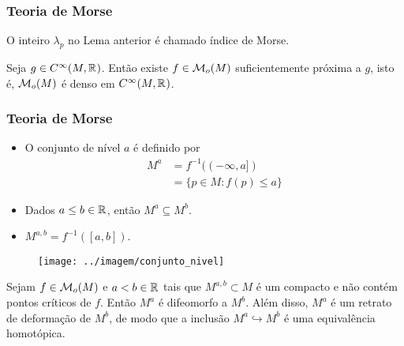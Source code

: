 \documentclass{beamer}
\begin{document}
\begin{footnotesize}
\begin{frame}
		\frametitle{Teoria de Morse}
		\begin{definicao}
			O inteiro $\lambda_{p}$ no Lema anterior é chamado índice de Morse.
		\end{definicao}
		
		\begin{teorema}
			Seja $g\in C^{\infty}(M, \mathbb{R}^{})$. Então existe $f \in \mathcal{M}_{o}(M)$ suficientemente próxima a $g$, isto é, $\mathcal{M}_{o}(M)$ é denso em $C^{\infty}(M, \mathbb{R}^{})$.
		\end{teorema}
	\end{frame}
	
	\begin{frame}
	
	\frametitle{Teoria de Morse}
		
			
			\begin{minipage}[t]{0.5\linewidth}
				\begin{itemize}
					\item O conjunto de nível $a$ é definido por
					$$
					\begin{aligned}
					M^{a}&= f^{-1}((-\infty, a]) 
					\\
					&= \{p \in M: f(p)\leq a\}
					\end{aligned}
					$$
					
					\item Dados $a\leq b \in \mathbb{R}^{}$, então $M^{a} \subseteq M^{b}$.
					
					\item $M^{a,b} = f^{-1}([a,b])$.
				\end{itemize}
			\end{minipage}
			\hfill%
			\begin{minipage}[t]{0.48\linewidth}
				\begin{figure}
					\centering
					\textbf{}\par
					\texttt{[image: ../imagem/conjunto\_nivel]}
				\end{figure}
				
			\end{minipage}
			
			\begin{teorema}
				Sejam $f \in \mathcal{M}_{o}(M)$ e $a<b \in \mathbb{R}^{}$ tais que $M^{a,b}\subset M$ é um compacto e não contém pontos críticos de $f$. Então $M^{a}$ é difeomorfo a $M^{b}$. Além disso, $M^{a}$ é um retrato de deformação de $M^{b}$, de modo que a inclusão  $M^{a} \hookrightarrow M^{b}$ é uma equivalência homotópica.
			\end{teorema}
			

\end{frame}
\end{footnotesize}
\end{document}
